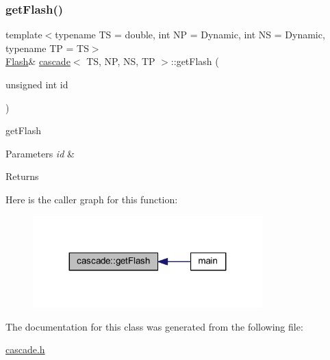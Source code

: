 \subsubsection{\texorpdfstring{get\+Flash()}{getFlash()}}
{\footnotesize\ttfamily template$<$typename TS = double, int NP = Dynamic, int NS = Dynamic, typename TP = TS$>$ \\
\mbox{\hyperlink{class_flash}{Flash}}\& \mbox{\hyperlink{classcascade}{cascade}}$<$ TS, NP, NS, TP $>$\+::get\+Flash (\begin{DoxyParamCaption}\item[{unsigned int}]{id }\end{DoxyParamCaption})\hspace{0.3cm}{\ttfamily [inline]}}



get\+Flash 


\begin{DoxyParams}{Parameters}
{\em id} & \\
\hline
\end{DoxyParams}
\begin{DoxyReturn}{Returns}

\end{DoxyReturn}
Here is the caller graph for this function\+:\nopagebreak
\begin{figure}[H]
\begin{center}
\leavevmode
\includegraphics[width=251pt]{classcascade_a1608f0fc7e55bd87b4fc1a109ded71fa_icgraph}
\end{center}
\end{figure}


The documentation for this class was generated from the following file\+:\begin{DoxyCompactItemize}
\item 
\mbox{\hyperlink{cascade_8h}{cascade.\+h}}\end{DoxyCompactItemize}
